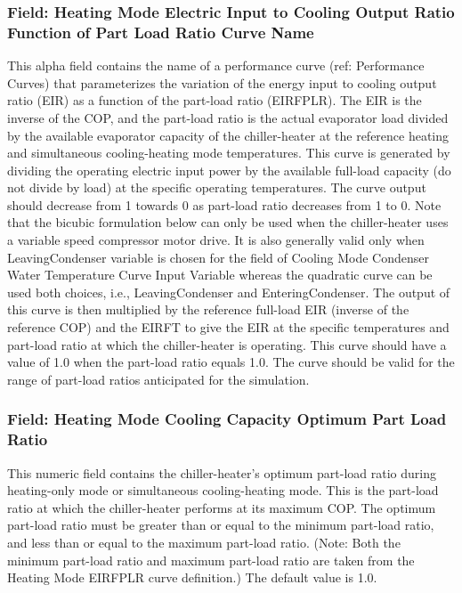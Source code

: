 \subsubsection{Field: Heating Mode Electric Input to Cooling Output Ratio Function of Part Load Ratio Curve Name}\label{field-heating-mode-electric-input-to-cooling-output-ratio-function-of-part-load-ratio-curve-name}

This alpha field contains the name of a performance curve (ref: Performance Curves) that parameterizes the variation of the energy input to cooling output ratio (EIR) as a function of the part-load ratio (EIRFPLR). The EIR is the inverse of the COP, and the part-load ratio is the actual evaporator load divided by the available evaporator capacity of the chiller-heater at the reference heating and simultaneous cooling-heating mode temperatures. This curve is generated by dividing the operating electric input power by the available full-load capacity (do not divide by load) at the specific operating temperatures. The curve output should decrease from 1 towards 0 as part-load ratio decreases from 1 to 0. Note that the bicubic formulation below can only be used when the chiller-heater uses a variable speed compressor motor drive. It is also generally valid only when LeavingCondenser variable is chosen for the field of Cooling Mode Condenser Water Temperature Curve Input Variable whereas the quadratic curve can be used both choices, i.e., LeavingCondenser and EnteringCondenser. The output of this curve is then multiplied by the reference full-load EIR (inverse of the reference COP) and the EIRFT to give the EIR at the specific temperatures and part-load ratio at which the chiller-heater is operating. This curve should have a value of 1.0 when the part-load ratio equals 1.0. The curve should be valid for the range of part-load ratios anticipated for the simulation.

\subsubsection{Field: Heating Mode Cooling Capacity Optimum Part Load Ratio}\label{field-heating-mode-cooling-capacity-optimum-part-load-ratio}

This numeric field contains the chiller-heater's optimum part-load ratio during heating-only mode or simultaneous cooling-heating mode. This is the part-load ratio at which the chiller-heater performs at its maximum COP. The optimum part-load ratio must be greater than or equal to the minimum part-load ratio, and less than or equal to the maximum part-load ratio. (Note: Both the minimum part-load ratio and maximum part-load ratio are taken from the Heating Mode EIRFPLR curve definition.) The default value is 1.0.

